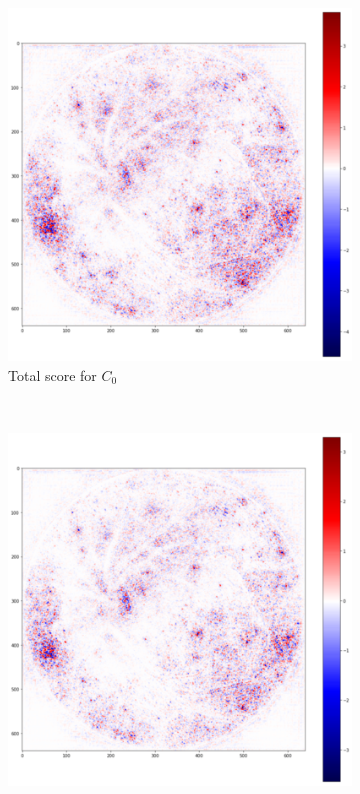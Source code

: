 \documentclass[preprint]{elsarticle}
\theoremstyle{definition} %
\theoremstyle{remark}
\begin{document}
\begin{figure}[h!]
	\centering
	\begin{subfigure}[b]{0.43\textwidth}
		\includegraphics[width=\textwidth]{figures/score_prop_23713_left/score_total_c0.png}
		\caption{Total score for $C_0$}
	\end{subfigure}~
	\begin{subfigure}[b]{0.43\textwidth}		
		\includegraphics[width=\textwidth]{figures/score_prop_23713_left/score_total_c1.png}

\end{subfigure}
\end{figure}
\end{document}
